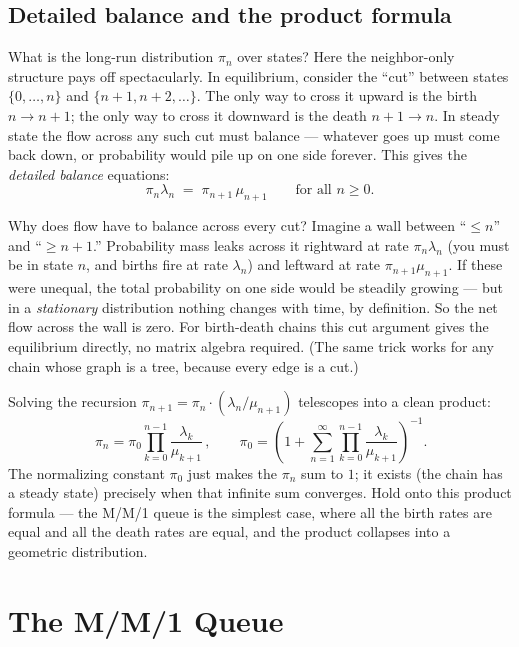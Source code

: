 \subsection{Detailed balance and the product formula}

What is the long-run distribution $\pi_n$ over states? Here the neighbor-only structure pays off
spectacularly. In equilibrium, consider the ``cut'' between states $\{0, \dots, n\}$ and
$\{n+1, n+2, \dots\}$. The only way to cross it upward is the birth $n \to n+1$; the only way to
cross it downward is the death $n+1 \to n$. In steady state the flow across any such cut must
balance --- whatever goes up must come back down, or probability would pile up on one side forever.
This gives the \emph{detailed balance} equations:
\[
  \pi_n \lambda_n \;=\; \pi_{n+1}\,\mu_{n+1}
  \qquad\text{for all } n \ge 0.
\]

\begin{whybox}
Why does flow have to balance across every cut? Imagine a wall between ``$\le n$'' and ``$\ge n+1$.''
Probability mass leaks across it rightward at rate $\pi_n \lambda_n$ (you must be in state $n$, and
births fire at rate $\lambda_n$) and leftward at rate $\pi_{n+1}\mu_{n+1}$. If these were unequal,
the total probability on one side would be steadily growing --- but in a \emph{stationary}
distribution nothing changes with time, by definition. So the net flow across the wall is zero. For
birth-death chains this cut argument gives the equilibrium directly, no matrix algebra required. (The
same trick works for any chain whose graph is a tree, because every edge is a cut.)
\end{whybox}

Solving the recursion $\pi_{n+1} = \pi_n \cdot (\lambda_n / \mu_{n+1})$ telescopes into a clean
product:
\[
  \boxed{\,\pi_n = \pi_0 \prod_{k=0}^{n-1} \frac{\lambda_k}{\mu_{k+1}}\,,}
  \qquad
  \pi_0 = \left(1 + \sum_{n=1}^{\infty} \prod_{k=0}^{n-1}\frac{\lambda_k}{\mu_{k+1}}\right)^{-1}.
\]
The normalizing constant $\pi_0$ just makes the $\pi_n$ sum to $1$; it exists (the chain has a steady
state) precisely when that infinite sum converges. Hold onto this product formula --- the M/M/1
queue is the simplest case, where all the birth rates are equal and all the death rates are equal,
and the product collapses into a geometric distribution.

\section{The M/M/1 Queue}
\label{ch27:mm1}

